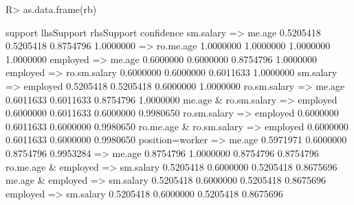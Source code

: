 \begin{Schunk}
% --begin: "searchrules3"
\begin{Sinput}
R> as.data.frame(rb)
\end{Sinput}
\begin{Soutput}
                                       support lhsSupport rhsSupport confidence
sm.salary => me.age                  0.5205418  0.5205418  0.8754796  1.0000000
 => ro.me.age                        1.0000000  1.0000000  1.0000000  1.0000000
employed => me.age                   0.6000000  0.6000000  0.8754796  1.0000000
employed => ro.sm.salary             0.6000000  0.6000000  0.6011633  1.0000000
sm.salary => employed                0.5205418  0.5205418  0.6000000  1.0000000
ro.sm.salary => me.age               0.6011633  0.6011633  0.8754796  1.0000000
me.age & ro.sm.salary => employed    0.6000000  0.6011633  0.6000000  0.9980650
ro.sm.salary => employed             0.6000000  0.6011633  0.6000000  0.9980650
ro.me.age & ro.sm.salary => employed 0.6000000  0.6011633  0.6000000  0.9980650
position=worker => me.age            0.5971971  0.6000000  0.8754796  0.9953284
 => me.age                           0.8754796  1.0000000  0.8754796  0.8754796
ro.me.age & employed => sm.salary    0.5205418  0.6000000  0.5205418  0.8675696
me.age & employed => sm.salary       0.5205418  0.6000000  0.5205418  0.8675696
employed => sm.salary                0.5205418  0.6000000  0.5205418  0.8675696
\end{Soutput}
%
% --end: "searchrules3"
\end{Schunk}
